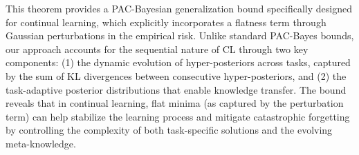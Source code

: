 \documentclass{article} %
\begin{document}
This theorem provides a PAC-Bayesian generalization bound specifically designed for continual learning, which explicitly incorporates a flatness term through Gaussian perturbations in the empirical risk. Unlike standard PAC-Bayes bounds, our approach accounts for the sequential nature of CL through two key components: (1) the dynamic evolution of hyper-posteriors across tasks, captured by the sum of KL divergences between consecutive hyper-posteriors, and (2) the task-adaptive posterior distributions that enable knowledge transfer. The bound reveals that in continual learning, flat minima (as captured by the perturbation term) can help stabilize the learning process and mitigate catastrophic forgetting by controlling the complexity of both task-specific solutions and the evolving meta-knowledge.











\end{document}
